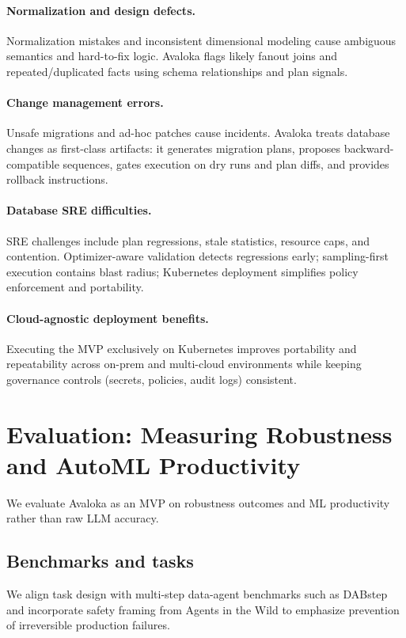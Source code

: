\documentclass{article} %
\begin{document}
\paragraph{Normalization and design defects.}
Normalization mistakes and inconsistent dimensional modeling cause ambiguous semantics and hard-to-fix logic.
Avaloka flags likely fanout joins and repeated/duplicated facts using schema relationships and plan signals.

\paragraph{Change management errors.}
Unsafe migrations and ad-hoc patches cause incidents. Avaloka treats database changes as first-class artifacts:
it generates migration plans, proposes backward-compatible sequences, gates execution on dry runs and plan diffs,
and provides rollback instructions.

\paragraph{Database SRE difficulties.}
SRE challenges include plan regressions, stale statistics, resource caps, and contention. Optimizer-aware
validation detects regressions early; sampling-first execution contains blast radius; Kubernetes deployment
simplifies policy enforcement and portability.

\paragraph{Cloud-agnostic deployment benefits.}
Executing the MVP exclusively on Kubernetes improves portability and repeatability across on-prem and multi-cloud
environments while keeping governance controls (secrets, policies, audit logs) consistent.

\section{Evaluation: Measuring Robustness and AutoML Productivity}
\label{sec:evaluation}
We evaluate Avaloka as an MVP on robustness outcomes and ML productivity rather than raw LLM accuracy.

\subsection{Benchmarks and tasks}
We align task design with multi-step data-agent benchmarks such as DABstep \citep{dabstep_adyen,dabstep_space}
and incorporate safety framing from Agents in the Wild \citep{agentswild2025,agentswild_site} to emphasize
prevention of irreversible production failures.
\end{document}
